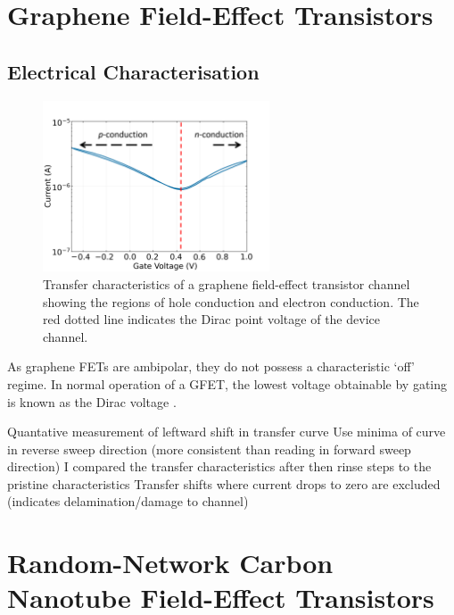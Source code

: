 \documentclass[
  a4paper,
]{scrbook}
\begin{document}
\hypertarget{graphene-field-effect-transistors}{%
\section{Graphene Field-Effect
Transistors}\label{graphene-field-effect-transistors}}

\hypertarget{sec-electrical-characterisation-graphene}{%
\subsection{Electrical
Characterisation}\label{sec-electrical-characterisation-graphene}}

\begin{figure}

{\centering \includegraphics[width=0.6\textwidth,height=\textheight]{figures/ch2/Graphene_transfer.png}

}

\caption{\label{fig-linker-raman}Transfer characteristics of a graphene
field-effect transistor channel showing the regions of hole conduction
and electron conduction. The red dotted line indicates the Dirac point
voltage of the device channel.}

\end{figure}

As graphene FETs are ambipolar, they do not possess a characteristic
`off' regime. In normal operation of a GFET, the lowest voltage
obtainable by gating is known as the Dirac voltage
\autocite{Murugathas2020}.

Quantative measurement of leftward shift in transfer curve Use minima of
curve in reverse sweep direction (more consistent than reading in
forward sweep direction) I compared the transfer characteristics after
then rinse steps to the pristine characteristics Transfer shifts where
current drops to zero are excluded (indicates delamination/damage to
channel)

\hypertarget{random-network-carbon-nanotube-field-effect-transistors}{%
\section{Random-Network Carbon Nanotube Field-Effect
Transistors}\label{random-network-carbon-nanotube-field-effect-transistors}}
\end{document}
